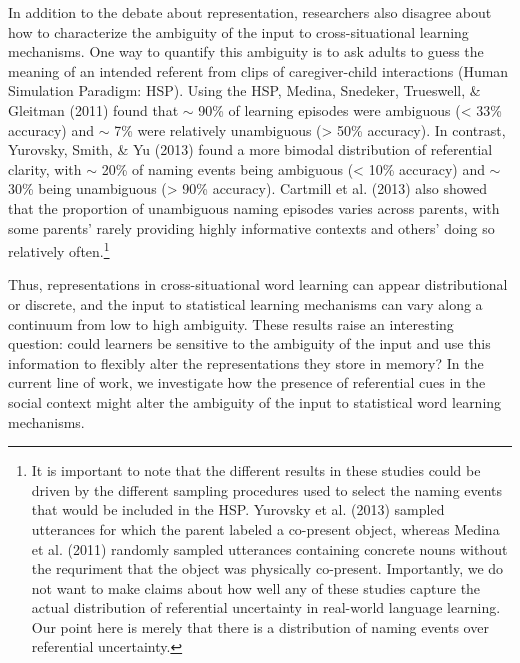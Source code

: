 \documentclass[authoryear, review]{elsarticle}
\begin{document}
In addition to the debate about representation, researchers also
disagree about how to characterize the ambiguity of the input to
cross-situational learning mechanisms. One way to quantify this
ambiguity is to ask adults to guess the meaning of an intended referent
from clips of caregiver-child interactions (Human Simulation Paradigm:
HSP). Using the HSP, Medina, Snedeker, Trueswell, \& Gleitman (2011)
found that \(\sim\) 90\% of learning episodes were ambiguous
(\textless{} 33\% accuracy) and \(\sim\) 7\% were relatively unambiguous
(\textgreater{} 50\% accuracy). In contrast, Yurovsky, Smith, \& Yu
(2013) found a more bimodal distribution of referential clarity, with
\(\sim\) 20\% of naming events being ambiguous (\textless{} 10\%
accuracy) and \(\sim\) 30\% being unambiguous (\textgreater{} 90\%
accuracy). Cartmill et al. (2013) also showed that the proportion of
unambiguous naming episodes varies across parents, with some parents'
rarely providing highly informative contexts and others' doing so
relatively often.\footnote{It is important to note that the different
  results in these studies could be driven by the different sampling
  procedures used to select the naming events that would be included in
  the HSP. Yurovsky et al. (2013) sampled utterances for which the
  parent labeled a co-present object, whereas Medina et al. (2011)
  randomly sampled utterances containing concrete nouns without the
  requriment that the object was physically co-present. Importantly, we
  do not want to make claims about how well any of these studies capture
  the actual distribution of referential uncertainty in real-world
  language learning. Our point here is merely that there is a
  distribution of naming events over referential uncertainty.}

Thus, representations in cross-situational word learning can appear
distributional or discrete, and the input to statistical learning
mechanisms can vary along a continuum from low to high ambiguity. These
results raise an interesting question: could learners be sensitive to
the ambiguity of the input and use this information to flexibly alter
the representations they store in memory? In the current line of work,
we investigate how the presence of referential cues in the social
context might alter the ambiguity of the input to statistical word
learning mechanisms.
\end{document}
